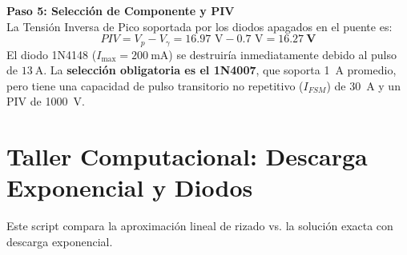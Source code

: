 \documentclass[11pt, a4paper]{article}
\begin{document}
\noindent \textbf{Paso 5: Selección de Componente y PIV}\\
La Tensión Inversa de Pico soportada por los diodos apagados en el puente es:
\begin{equation*}
    PIV = V_p - V_\gamma = 16.97\text{ V} - 0.7\text{ V} = \mathbf{\qty{16.27}{\volt}}
\end{equation*}
El diodo 1N4148 ($I_{\max} = \qty{200}{\milli\ampere}$) se destruiría inmediatamente debido al pulso de $\qty{13}{\ampere}$. La \textbf{selección obligatoria es el 1N4007}, que soporta \qty{1}{\ampere} promedio, pero tiene una capacidad de pulso transitorio no repetitivo ($I_{FSM}$) de \qty{30}{\ampere} y un PIV de \qty{1000}{\volt}.

\newpage
\section{Taller Computacional: Descarga Exponencial y Diodos}
Este script compara la aproximación lineal de rizado vs. la solución exacta con descarga exponencial.
\end{document}
